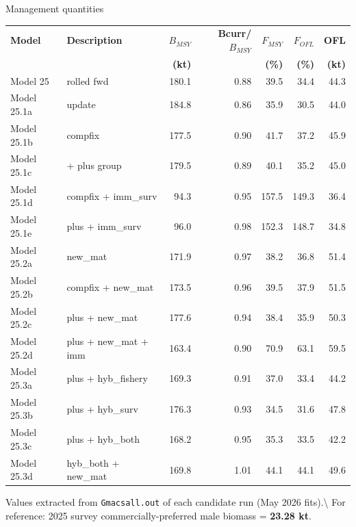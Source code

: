 \documentclass[
  10pt,
  ignorenonframetext,
  aspectratio=169,
]{beamer}
\begin{document}
\begin{frame}[fragile]{Management quantities}
\label{management-quantities}
\centering
\tiny

\renewcommand{\arraystretch}{1.05}
\begin{tabular}{llrrrrr}
\toprule
\textbf{Model} & \textbf{Description} & \textbf{$B_{MSY}$} & \textbf{Bcurr/$B_{MSY}$} & \textbf{$F_{MSY}$} & \textbf{$F_{OFL}$} & \textbf{OFL} \\
 & & \textbf{(kt)} & & \textbf{(\%)} & \textbf{(\%)} & \textbf{(kt)} \\
\midrule
Model 25     & rolled fwd            & 180.1 & 0.88 & 39.5  & 34.4  & 44.3 \\

Model 25.1a  & update                & 184.8 & 0.86 & 35.9  & 30.5  & 44.0 \\
Model 25.1b  & compfix               & 177.5 & 0.90 & 41.7  & 37.2  & 45.9 \\

Model 25.1c  & + plus group          & 179.5 & 0.89 & 40.1  & 35.2  & 45.0 \\
Model 25.1d  & compfix + imm\_surv   & 94.3  & 0.95 & 157.5 & 149.3 & 36.4 \\

Model 25.1e  & plus + imm\_surv      & 96.0  & 0.98 & 152.3 & 148.7 & 34.8 \\
Model 25.2a  & new\_mat              & 171.9 & 0.97 & 38.2  & 36.8  & 51.4 \\

Model 25.2b  & compfix + new\_mat    & 173.5 & 0.96 & 39.5  & 37.9  & 51.5 \\
Model 25.2c  & plus + new\_mat       & 177.6 & 0.94 & 38.4  & 35.9  & 50.3 \\

Model 25.2d  & plus + new\_mat + imm & 163.4 & 0.90 & 70.9  & 63.1  & 59.5 \\
Model 25.3a  & plus + hyb\_fishery   & 169.3 & 0.91 & 37.0  & 33.4  & 44.2 \\

Model 25.3b  & plus + hyb\_surv      & 176.3 & 0.93 & 34.5  & 31.6  & 47.8 \\
Model 25.3c  & plus + hyb\_both      & 168.2 & 0.95 & 35.3  & 33.5  & 42.2 \\

Model 25.3d  & hyb\_both + new\_mat  & 169.8 & 1.01 & 44.1  & 44.1  & 49.6 \\
\bottomrule
\end{tabular}

\medskip

\tiny Values extracted from \texttt{Gmacsall.out} of each candidate run
(May 2026 fits).\textbackslash{} \tiny For reference: 2025 survey
commercially-preferred male biomass = \textbf{23.28 kt}.
\end{frame}
\end{document}
